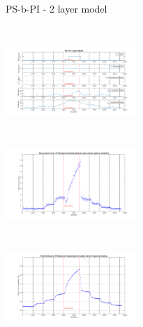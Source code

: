 \documentclass[10pt]{beamer}
\begin{document}
\begin{frame}{PS-b-PI - 2 layer model}
\begin{columns}[t]
\centering
\includegraphics[width=5cm,height=3.5cm]{Results_2layer_PSbPI.png}\\
\centering
\includegraphics[width=5cm,height=4cm]{MSE_2layer_PSbPI.png}\\
\includegraphics[width=5cm,height=3.5cm]{total_thickness_2layer_PSbPI.png}
\end{columns}
\end{frame}
\end{document}
